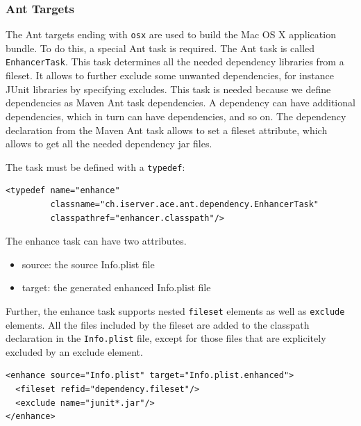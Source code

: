 \documentclass[11pt,a4paper]{article}
\begin{document}
\subsubsection{Ant Targets}
The Ant targets ending with \texttt{osx} are used to build the Mac OS X
application bundle. To do this, a special Ant task is required. The Ant
task is called \texttt{EnhancerTask}. This task determines all the needed
dependency libraries from a fileset. It allows to further exclude some
unwanted dependencies, for instance JUnit libraries by specifying excludes.
This task is needed because we define dependencies as Maven Ant task
dependencies. A dependency can have additional dependencies, which in turn
can have dependencies, and so on. The dependency declaration from 
the Maven Ant task allows to set a fileset attribute, which allows to
get all the needed dependency jar files.

The task must be defined with a \texttt{typedef}:

\small{
\begin{verbatim}
<typedef name="enhance"
         classname="ch.iserver.ace.ant.dependency.EnhancerTask"
         classpathref="enhancer.classpath"/>
\end{verbatim}
}

The enhance task can have two attributes.
\begin{itemize}
 \item source: the source Info.plist file
 \item target: the generated enhanced Info.plist file
\end{itemize}

Further, the enhance task supports nested \texttt{fileset} elements as well
as \texttt{exclude} elements. All the files included by the fileset are
added to the classpath declaration in the \texttt{Info.plist} file, except
for those files that are explicitely excluded by an exclude element.

\small{
\begin{verbatim}
<enhance source="Info.plist" target="Info.plist.enhanced">
  <fileset refid="dependency.fileset"/>
  <exclude name="junit*.jar"/>
</enhance>
\end{verbatim}
}
\end{document}
